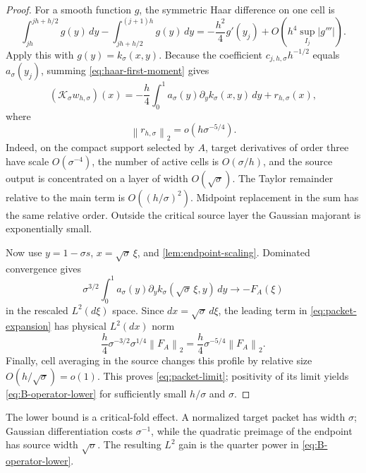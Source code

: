 \documentclass[11pt]{article}
\theoremstyle{definition}
\theoremstyle{remark}
\newcommand{\cK}{\mathcal K}
\newcommand{\norm}[1]{\left\lVert #1\right\rVert}
\begin{document}
\begin{proof}
For a smooth function \(g\), the symmetric Haar difference on one cell is
\begin{equation}
 \int_{jh}^{jh+h/2}g(y)\,dy
 -\int_{jh+h/2}^{(j+1)h}g(y)\,dy
 =-\frac{h^2}{4}g'(y_j)
 +O\!\left(h^4\sup_{I_j}|g'''|\right).
 \label{eq:haar-first-moment}
\end{equation}
Apply this with \(g(y)=k_\sigma(x,y)\).  Because the coefficient
\(c_{j,h,\sigma}h^{-1/2}\) equals \(a_\sigma(y_j)\), summing
\eqref{eq:haar-first-moment} gives
\begin{equation}
 (\cK_\sigma w_{h,\sigma})(x)
 =-\frac h4\int_0^1
 a_\sigma(y)\partial_yk_\sigma(x,y)\,dy
 +r_{h,\sigma}(x),
 \label{eq:packet-expansion}
\end{equation}
where
\begin{equation}
 \norm{r_{h,\sigma}}_2
 =o(h\sigma^{-5/4}).
 \label{eq:packet-remainder}
\end{equation}
Indeed, on the compact support selected by \(A\), target derivatives of
order three have scale \(O(\sigma^{-4})\), the number of active cells is
\(O(\sigma/h)\), and the source output is concentrated on a layer of width
\(O(\sqrt\sigma)\).  The Taylor remainder relative to the main term is
\(O((h/\sigma)^2)\).  Midpoint replacement in the sum has the same relative
order.  Outside the critical source layer the Gaussian majorant is
exponentially small.

Now use \(y=1-\sigma s\), \(x=\sqrt\sigma\,\xi\), and
\cref{lem:endpoint-scaling}.  Dominated convergence gives
\begin{equation}
 \sigma^{3/2}
 \int_0^1a_\sigma(y)\partial_yk_\sigma(
 \sqrt\sigma\,\xi,y)\,dy
 \longrightarrow- F_A(\xi)
 \label{eq:packet-profile-convergence}
\end{equation}
in the rescaled \(L^2(d\xi)\) space.  Since \(dx=\sqrt\sigma\,d\xi\),
the leading term in \eqref{eq:packet-expansion} has physical \(L^2(dx)\)
norm
\[
 \frac h4\sigma^{-3/2}\sigma^{1/4}\norm{F_A}_2
 =\frac h4\sigma^{-5/4}\norm{F_A}_2.
\]
Finally, cell averaging in the source changes this profile by relative size
\(O(h/\sqrt\sigma)=o(1)\).  This proves \eqref{eq:packet-limit}; positivity
of its limit yields \eqref{eq:B-operator-lower} for sufficiently small
\(h/\sigma\) and \(\sigma\).
\end{proof}

The lower bound is a critical-fold effect.  A normalized target packet has
width \(\sigma\); Gaussian differentiation costs \(\sigma^{-1}\), while
the quadratic preimage of the endpoint has source width \(\sqrt\sigma\).
The resulting \(L^2\) gain is the quarter power in
\eqref{eq:B-operator-lower}.
\end{document}
